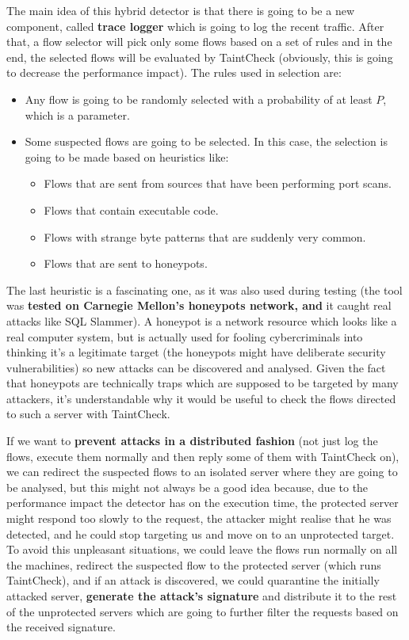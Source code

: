 \documentclass[10pt,a4paper,english,onecolumn]{IEEEtran}
\begin{document}
The main idea of this hybrid detector is that there is going to be a new component, called \textbf{trace logger} which is going to log the recent traffic. After that, a flow selector will pick only some flows based on a set of rules and in the end, the selected flows will be evaluated by TaintCheck (obviously, this is going to decrease the performance impact). The rules used in selection are:

\begin{itemize}
    \item Any flow is going to be randomly selected with a probability of at least $ P $, which is a parameter.
    \item Some suspected flows are going to be selected. In this case, the selection is going to be made based on heuristics like:
        \begin{itemize}
            \item Flows that are sent from sources that have been performing port scans.
            \item Flows that contain executable code.
            \item Flows with strange byte patterns that are suddenly very common.
            \item Flows that are sent to honeypots.
    \end{itemize}
\end{itemize}

The last heuristic is a fascinating one, as it was also used during testing (the tool was \textbf{tested on Carnegie Mellon's honeypots network, and} it caught real attacks like SQL Slammer). A honeypot is a network resource which looks like a real computer system, but is actually used for fooling cybercriminals into thinking it's a legitimate target (the honeypots might have deliberate security vulnerabilities) so new attacks can be discovered and analysed. Given the fact that honeypots are technically traps which are supposed to be targeted by many attackers, it's understandable why it would be useful to check the flows directed to such a server with TaintCheck.

If we want to \textbf{prevent attacks in a distributed fashion} (not just log the flows, execute them normally and then reply some of them with TaintCheck on), we can redirect the suspected flows to an isolated server where they are going to be analysed, but this might not always be a good idea because, due to the performance impact the detector has on the execution time, the protected server might respond too slowly to the request, the attacker might realise that he was detected, and he could stop targeting us and move on to an unprotected target. To avoid this unpleasant situations, we could leave the flows run normally on all the machines, redirect the suspected flow to the protected server (which runs TaintCheck), and if an attack is discovered, we could quarantine the initially attacked server, \textbf{generate the attack's signature} and distribute it to the rest of the unprotected servers which are going to further filter the requests based on the received signature.
\end{document}
